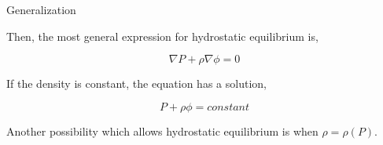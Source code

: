 \documentclass[]{beamer}
\begin{document}



\begin{frame}
  \textcolor{mypink1}{Generalization}
\vspace{5mm}

Then, the most general expression for hydrostatic equilibrium is, 

\begin{equation}
\boxed{\nabla P+\rho \nabla \phi =0}
\end{equation}
\pause

If the density is constant, the equation has a solution,

\begin{equation}
 \boxed{P+\rho  \phi=constant}
\end{equation}

\vspace{3mm}
\pause
Another possibility which allows hydrostatic equilibrium is when $\rho=\rho(P)$.



\end{frame}





 
\end{document}
